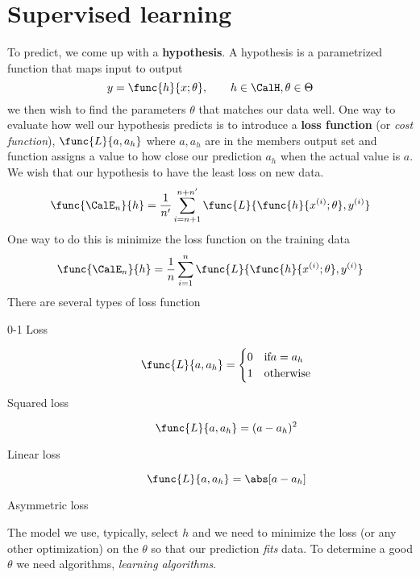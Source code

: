 \chapter{Supervised learning}
To predict, we come up with a \textbf{hypothesis}. A hypothesis is a parametrized function that maps input to output
\begin{equation*}
    y = \func{h}{x ; \theta} , \qquad h \in \CalH, \theta \in \Theta
\end{equation*}
we then wish to find the parameters \(\theta\) that matches our data well. One way to evaluate how well our hypothesis predicts is to introduce a \textbf{loss function} (or \textit{cost function}), \(\func{L}{a,a_h}\) where \(a,a_h\) are in the members output set and function assigns a value to how close our prediction \(a_h\) when the actual value is \(a\). We wish that our hypothesis to have the least loss on new data.
\begin{equation*}
    \func{\CalE_n}{h} = \dfrac{1}{n'} \sum_{i = n + 1}^{n + n'} \func{L}{\func{h}{x^{(i)} ; \theta }, y^{(i)}}
\end{equation*}
One way to do this is minimize the loss function on the training data
\begin{equation*}
    \func{\CalE_n}{h} = \dfrac{1}{n} \sum_{i = 1}^n \func{L}{\func{h}{x^{(i)} ; \theta }, y^{(i)}}
\end{equation*}
There are several types of loss function
\begin{description}
    \item[0-1 Loss]
        \begin{equation*}
            \func{L}{a,a_h} = \begin{cases}
                0 & \text{if} a = a_h \\
                1 & \text{otherwise}
            \end{cases}
        \end{equation*}
    \item[Squared loss]
        \begin{equation*}
            \func{L}{a,a_h} = (a - a_h)^2
        \end{equation*}
    \item[Linear loss]
        \begin{equation*}
            \func{L}{a,a_h} = \abs[a - a_h]
        \end{equation*}
    \item[Asymmetric loss]
\end{description}
The model we use, typically, select \(h\) and we need to minimize the loss (or any other optimization) on the \(\theta\) so that our prediction \textit{fits} data. To determine a good \(\theta\) we need algorithms, \textit{learning algorithms}.
